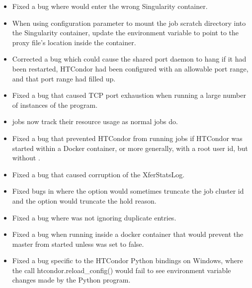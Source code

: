 \begin{itemize}

\item Fixed a bug where   would enter the wrong Singularity
container.

\item When using configuration parameter 
to mount the job scratch directory into the Singularity container,
update the  environment variable to point to the
proxy file's location inside the container.

\item Corrected a bug which could cause the shared port daemon to hang if
it had been restarted, HTCondor had been configured with an allowable
port range, and that port range had filled up.

\item Fixed a bug that caused TCP port exhaustion when running a large
number of instances of the  program.

\item {}  jobs now track their resource usage as normal jobs do.

\item Fixed a bug that prevented HTCondor from running jobs if
HTCondor was started within a Docker container, or more generally,
with a root user id, but without .

\item Fixed a bug that caused corruption of the XferStatsLog.

\item Fixed bugs in  where the  option would sometimes
truncate the job cluster id and the  option would truncate the hold reason.

\item Fixed a bug where  was not ignoring
duplicate entries.

\item Fixed a bug when running inside a docker container that would prevent
the master from started unless  was set to
false.

\item Fixed a bug specific to the HTCondor Python bindings on Windows, where
the call htcondor.reload\_config() would fail to see 
environment variable changes made by the Python program.


\end{itemize}
